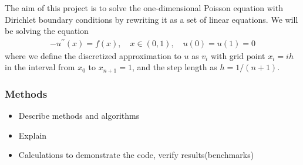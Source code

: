 \documentclass[12pt]{article}
\begin{document}
\noindent The aim of this project is to solve the one-dimensional Poisson equation with Dirichlet boundary conditions by rewriting it as a set of linear equations. We will be solving the equation
\begin{align*}
-u^{\prime \prime}(x) = f(x), \quad x \in (0,1), \quad  u(0) = u(1) = 0
\end{align*} 
where we define the discretized approximation to $u$ as $v_i$ with grid point $x_i = ih$ in the interval from $x_0$ to $x_{n+1} = 1$, and the step length as $h = 1/(n+1)$. 


\subsubsection*{Methods}

\begin{itemize}
\item Describe methods and algorithms
\item Explain
\item Calculations to demonstrate the code, verify results(benchmarks) 
\end{itemize}
\end{document}
